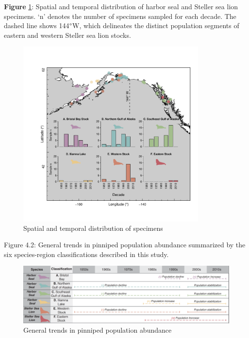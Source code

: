 \documentclass [11pt, proquest] {uwthesis}[2015/03/03]
\begin{document}
\textbf{Figure} \ref{fig:map4}: Spatial and temporal distribution of
harbor seal and Steller sea lion specimens. `n' denotes the number of
specimens sampled for each decade. The dashed line shows
144\(\text{\textdegree}\)W, which delineates the distinct population
segments of eastern and western Steller sea lion stocks. \newline 
\begin{figure}[h]
\centering
  \includegraphics[width=0.85\textwidth]{figure/Ch4/Figure1.pdf}
  \caption{Spatial and temporal distribution of specimens}
  \label{fig:map4}
\end{figure}
\clearpage
\begin{landscape}
Figure 4.2: General trends in pinniped population abundance summarized by the six species-region classifications described in this study. 
\newline 
\begin{figure}[h]
\centering
  \includegraphics[width=1.2\textwidth]{figure/Ch4/Figure2.pdf}
  \caption{General trends in pinniped population abundance}
  \label{fig:timeline}
\end{figure}
\end{landscape}
\clearpage
\end{document}
